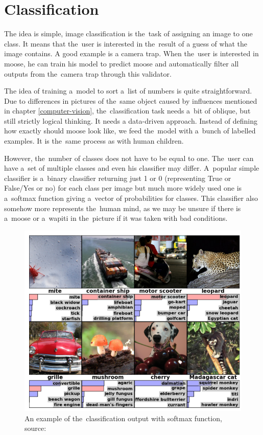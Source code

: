 \section{Classification}
\label{classification}

The idea is simple, image classification is the~task of assigning an image to 
one class. It means that the~user is interested in the~result of a guess of what 
the image contains. A good example is a camera trap. When the~user is interested 
in moose, he can train his model to predict moose and automatically filter all 
outputs from the~camera trap through this validator.

The idea of training a~model to sort a~list of numbers is quite 
straightforward. Due to differences in pictures of the~same object caused by 
influences mentioned in chapter \ref{computer-vision}, the~classification task 
needs a~bit of oblique, but still strictly logical thinking. It needs a 
data-driven approach. Instead of defining how exactly should moose look like, we 
feed the~model with a~bunch of labelled examples. It is the~same process as with 
human children.

However, the~number of classes does not have to be equal to one. The~user can 
have a~set of multiple classes and even his classifier may differ. A~popular 
simple classifier is a~binary classifier returning just 1 or 0 (representing 
True or False/Yes or no) for each class per image but much more widely used one 
is a~softmax function giving a~vector of probabilities for classes. This 
classifier also somehow more represents the~human mind, as we may be unsure if 
there is a~moose or a~wapiti in the~picture if it was taken with bad 
conditions.

\begin{figure}[H]
   \centering
	\includegraphics[width=.8\linewidth]{./pictures/classification.png}
	\caption[Classification example]{An example of the~classification output with 
	softmax function, source: \cite{cnn-classification}}
      \label{fig:class}
\end{figure}

